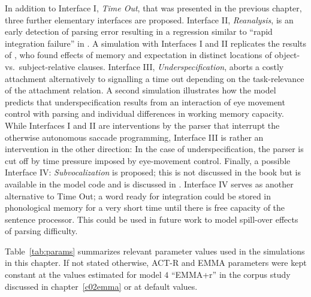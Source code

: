 \documentclass{cambridge7A}\usepackage[]{graphicx}\usepackage[]{color}
\begin{document}
In addition to Interface I, \emph{Time Out}, that was presented in the previous chapter, three further elementary interfaces are proposed. Interface II,  \emph{Reanalysis}, is an early detection of parsing error resulting in a regression similar to ``rapid integration failure'' in \cite{ReichleWarrenMcConnell2009}.
A simulation with Interfaces I and II replicates the results of \cite{Staub2010a}, who found effects of memory and expectation in distinct locations of object- vs.\ subject-relative clauses. 
Interface III,  \emph{Underspecification}, aborts a costly attachment alternatively to signalling a time out depending on the task-relevance of the attachment relation.
A second simulation illustrates how the model predicts that underspecification results from an interaction of eye movement control with parsing and individual differences in working memory capacity.
While Interfaces I and II are interventions by the parser that interrupt the otherwise autonomous saccade programming, Interface III is rather an intervention in the other direction: In the case of underspecification, the parser is cut off by time pressure imposed by eye-movement control.
Finally, a possible Interface IV:  \emph{Subvocalization} is proposed; this is not discussed in the book but is available in the model code and is discussed in \cite{engelmann:phd}. Interface IV serves as another alternative to Time Out; a word ready for integration could be stored in phonological memory \citep{BaddeleyHitch1974,Baddeley2003} for a very short time until there is free capacity of the sentence processor. This could be used in future work to model spill-over effects of parsing difficulty.

Table~\ref{tab:params} summarizes relevant parameter values used in the simulations in this chapter. If not stated otherwise, ACT-R and EMMA parameters were kept constant at the values estimated for model $4$ ``EMMA+r'' in the corpus study discussed in chapter~\ref{c02emma} or at default values.
\end{document}
